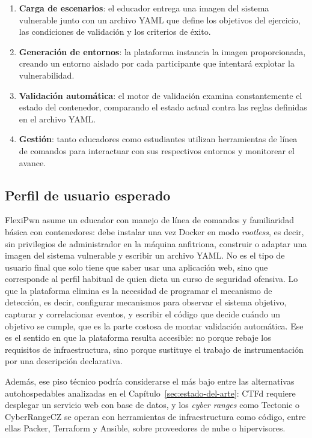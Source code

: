 \begin{enumerate}
    \item \textbf{Carga de escenarios}: el educador entrega una imagen del
    sistema vulnerable junto con un archivo YAML que define los objetivos del
    ejercicio, las condiciones de validación y los criterios de éxito.

    \item \textbf{Generación de entornos}: la plataforma instancia la imagen
    proporcionada, creando un entorno aislado por cada participante que
    intentará explotar la vulnerabilidad.

    \item \textbf{Validación automática}: el motor de validación examina
    constantemente el estado del contenedor, comparando el estado actual contra
    las reglas definidas en el archivo YAML.

    \item \textbf{Gestión}: tanto educadores como estudiantes utilizan
    herramientas de línea de comandos para interactuar con sus respectivos
    entornos y monitorear el avance.
\end{enumerate}

\subsection{Perfil de usuario esperado}
\label{sec:perfil-usuario}

FlexiPwn asume un educador con manejo de línea de comandos y familiaridad
básica con contenedores: debe instalar una vez Docker en modo
\textit{rootless}, es decir, sin privilegios de administrador en la máquina
anfitriona, construir o adaptar una imagen del sistema vulnerable y escribir
un archivo YAML. No es el tipo de usuario final que solo tiene que saber usar una aplicación web, sino
que corresponde al perfil habitual de quien dicta un curso de
seguridad ofensiva. Lo que la plataforma elimina es la necesidad de programar
el mecanismo de detección, es decir, configurar mecanismos para observar el
sistema objetivo, capturar y correlacionar eventos, y escribir el código que decide cuándo un objetivo se
cumple, que es la parte costosa de montar validación automática. Ese es el
sentido en que la plataforma resulta accesible: no porque rebaje los
requisitos de infraestructura, sino porque sustituye el trabajo de
instrumentación por una descripción declarativa.

Además, ese piso técnico podría considerarse el más bajo entre las alternativas
autohospedables analizadas en el Capítulo~\ref{sec:estado-del-arte}: CTFd
requiere desplegar un servicio web con base de datos, y los \textit{cyber
ranges} como Tectonic o CyberRangeCZ se operan con herramientas de
infraestructura como código, entre ellas Packer, Terraform y Ansible, sobre
proveedores de nube o hipervisores.
